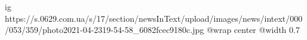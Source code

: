  
 
 
 
 

\ifcmt
  ig https://s.0629.com.ua/s/17/section/newsInText/upload/images/news/intext/000/053/359/photo2021-04-2319-54-58_6082fcec9180c.jpg
  @wrap center
  @width 0.7
\fi
